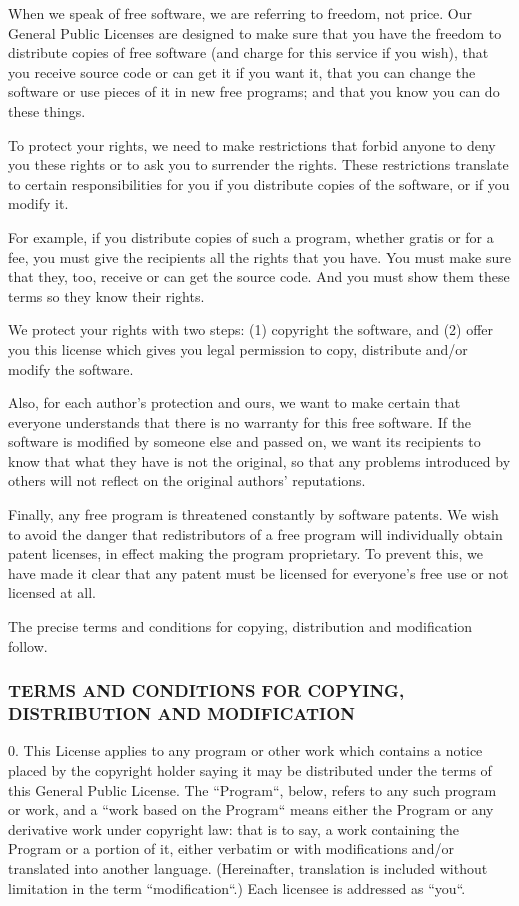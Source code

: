 \documentclass[a4paper, 11pt, twoside]{article}
\begin{document}
When we speak of free software, we are referring to freedom, not price. Our General Public Licenses are designed to make sure that you have the freedom to distribute copies of free software (and charge for this service if you wish), that you receive source code or can get it if you want it, that you can change the software or use pieces of it in new free programs; and that you know you can do these things.

To protect your rights, we need to make restrictions that forbid anyone to deny you these rights or to ask you to surrender the rights. These restrictions translate to certain responsibilities for you if you distribute copies of the software, or if you modify it.

For example, if you distribute copies of such a program, whether gratis or for a fee, you must give the recipients all the rights that you have. You must make sure that they, too, receive or can get the source code. And you must show them these terms so they know their rights.

We protect your rights with two steps: (1) copyright the software, and (2) offer you this license which gives you legal permission to copy, distribute and/or modify the software.

Also, for each author's protection and ours, we want to make certain that everyone understands that there is no warranty for this free software. If the software is modified by someone else and passed on, we want its recipients to know that what they have is not the original, so that any problems introduced by others will not reflect on the original authors' reputations.

Finally, any free program is threatened constantly by software patents. We wish to avoid the danger that redistributors of a free program will individually obtain patent licenses, in effect making the program proprietary. To prevent this, we have made it clear that any patent must be licensed for everyone's free use or not licensed at all.

The precise terms and conditions for copying, distribution and modification follow.

\subsubsection{TERMS AND CONDITIONS FOR COPYING, DISTRIBUTION AND MODIFICATION}

0. This License applies to any program or other work which contains a notice placed by the copyright holder saying it may be distributed under the terms of this General Public License. The “Program“, below, refers to any such program or work, and a “work based on the Program“ means either the Program or any derivative work under copyright law: that is to say, a work containing the Program or a portion of it, either verbatim or with modifications and/or translated into another language. (Hereinafter, translation is included without limitation in the term “modification“.) Each licensee is addressed as “you“.
\end{document}
